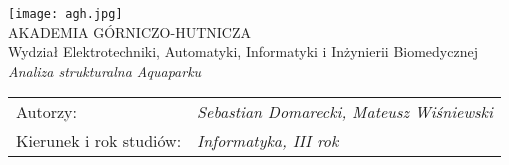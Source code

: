 \def\thesistable{
	\begin{tabular}{p{45mm}l}
		Autorzy: & {\itshape Sebastian Domarecki, Mateusz Wiśniewski}\\[-1mm]
		Kierunek i rok studi\'{o}w: & {\itshape {Informatyka, III rok}}\\
	\end{tabular}
}


\titlepage
\begin{center}
	\vspace*{1.5cm}
	\texttt{[image: agh.jpg]}\\
	\vspace*{2mm}
	\large AKADEMIA GÓRNICZO-HUTNICZA\\
	\vspace*{1mm}
	\large Wydział Elektrotechniki, Automatyki, Informatyki i Inżynierii Biomedycznej\\
	\vspace*{1cm}
	\sffamily\Large\itshape Analiza strukturalna Aquaparku
	
	
	\vspace{\fill}
\end{center}

\noindent
{\sffamily
	\thesistable
}